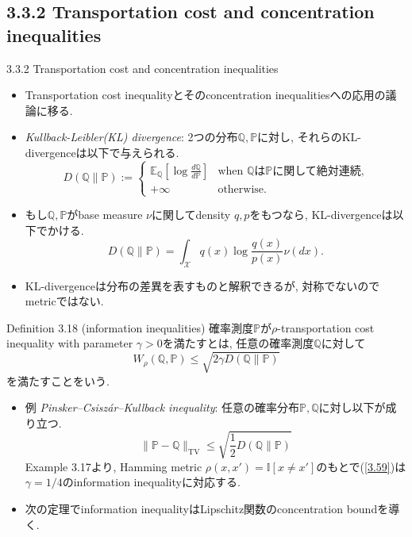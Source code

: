 \documentclass[aspectratio=169, dvipdfmx]{beamer}
\newcommand{\ex}{\mathbb{E}}
\newcommand{\bb}{\mathbb}
\newcommand{\cc}{\mathcal}
\begin{document}
\subsection{3.3.2 Transportation cost and concentration inequalities}
\begin{frame}{3.3.2 Transportation cost and concentration inequalities}
\begin{itemize}
    \item Transportation cost inequalityとそのconcentration inequalitiesへの応用の議論に移る.
    \item {\it Kullback-Leibler(KL) divergence}:
            2つの分布$\bb{Q},\bb{P}$に対し, それらのKL-divergenceは以下で与えられる.
            \[
                D(\bb{Q}\|\bb{P}) :=
                \begin{cases}
                    \ex_{\bb{Q}}\left[\log \frac{d\bb{Q}}{d\bb{P}}\right]
                    & \text{when $\bb{Q}$は$\bb{P}$に関して絶対連続,}\\
                    + \infty
                    & \text{otherwise.}
                \end{cases}
                \tag{3.56}\label{3.56}
            \]
    \item もし$\bb{Q}, \bb{P}$がbase measure $\nu$に関してdensity $q, p$をもつなら,
    KL-divergenceは以下でかける.
    \[
        D(\bb{Q}\|\bb{P}) = \int_{\cc{X}}q(x)\log\frac{q(x)}{p(x)}\nu(dx).
        \tag{3.57}\label{3.57}
    \]
    \item KL-divergenceは分布の差異を表すものと解釈できるが,
    対称でないのでmetricではない.
\end{itemize}
\end{frame}

\begin{frame}
\begin{block}{Definition 3.18 (information inequalities)}
    確率測度$\bb{P}$が$\rho$-transportation cost inequality with parameter $\gamma > 0$を満たすとは,
    任意の確率測度$\bb{Q}$に対して
    \[
        W_\rho(\bb{Q},\bb{P}) \le \sqrt{2\gamma D(\bb{Q}\|\bb{P})}
        \tag{3.58}\label{3.58}
    \]
    を満たすことをいう.
\end{block}
\begin{itemize}
    \item 例 {\it Pinsker–Csisz\'ar–Kullback inequality}:
        任意の確率分布$\bb{P}, \bb{Q}$に対し以下が成り立つ.
        \[
            \|\bb{P} - \bb{Q}\|_\mathrm{TV}
            \le \sqrt{\frac{1}{2}D(\bb{Q}\|\bb{P})}
            \tag{3.59}\label{3.59}
        \]
        Example 3.17より, Hamming metric $\rho(x,x')=\bb{I}[x\ne x']$のもとで(\ref{3.59})は$\gamma = 1/4$のinformation inequalityに対応する.
    \item 次の定理でinformation inequalityはLipschitz関数のconcentration boundを導く.
\end{itemize}
\end{frame}
\end{document}
